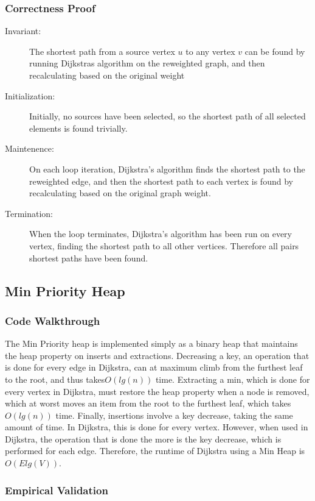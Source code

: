 \documentclass[a4paper,12pt]{article}
\begin{document}
\subsubsection{Correctness Proof}
\begin{description}
\item [Invariant: ] The shortest path from a source vertex $u$ to any vertex $v$ can be found by running Dijkstras algorithm on the reweighted graph, and then recalculating based on the original weight
\item [Initialization: ] Initially, no sources have been selected, so the shortest path of all selected elements is found trivially.
\item [Maintenence: ] On each loop iteration, Dijkstra's algorithm finds the shortest path to the reweighted edge, and then the shortest path to each vertex is found by recalculating based on the original graph weight.
\item [Termination: ] When the loop terminates, Dijkstra's algorithm has been run on every vertex, finding the shortest path to all other vertices. Therefore all pairs shortest paths have been found.
\end{description}
\subsection{Min Priority Heap}
\subsubsection{Code Walkthrough}

The Min Priority heap is implemented simply as a binary heap that maintains the heap
property on inserts and extractions. Decreasing a key, an operation that is done for every edge in Dijkstra, can at maximum climb from the furthest leaf to the root, and thus takes$O(lg(n))$ time. Extracting a min, which is done for every vertex in Dijkstra, must restore the heap property when a node is removed, which at worst moves an item from the root to the furthest leaf, which takes $O(lg(n))$ time. Finally, insertions involve a key decrease, taking the same amount of time. In Dijkstra, this is done for every vertex. However, when used in Dijkstra, the operation that is done the more is the key decrease, which is performed for each edge. Therefore, the runtime of Dijkstra using a Min Heap is $O(Elg(V))$.
\subsubsection{Empirical Validation}
\end{document}
